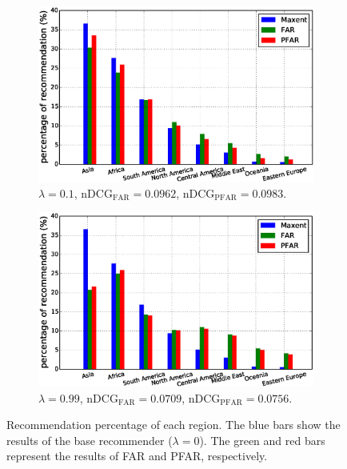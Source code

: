 


\begin{figure}[!htb]
\centering
\begin{subfigure}{0.495\columnwidth}
\includegraphics[width=\textwidth]{imgs/far/maxent-lambda01.png}
\caption{$\lambda=0.1$, $\text{nDCG}_{\text{FAR}}=0.0962$,\;\;\;\;\;\; $\text{nDCG}_{\text{PFAR}}=0.0983$. \label{subfig:lambda01}}
\end{subfigure}
\begin{subfigure}{0.495\columnwidth}
\includegraphics[width=\textwidth]{imgs/far/maxent-lambda10.png}
\caption{$\lambda=0.99$,  $\text{nDCG}_{\text{FAR}}=0.0709$,\;\;\;\;\; $\text{nDCG}_{\text{PFAR}}=0.0756$.\label{subfig:lambda10}}
\end{subfigure}
\caption{Recommendation percentage of each region. The blue bars show the results of the base recommender ($\lambda=0$). The green and red bars represent the results of FAR and PFAR, respectively.\label{fig:kiva_num_rec}}
\end{figure}



